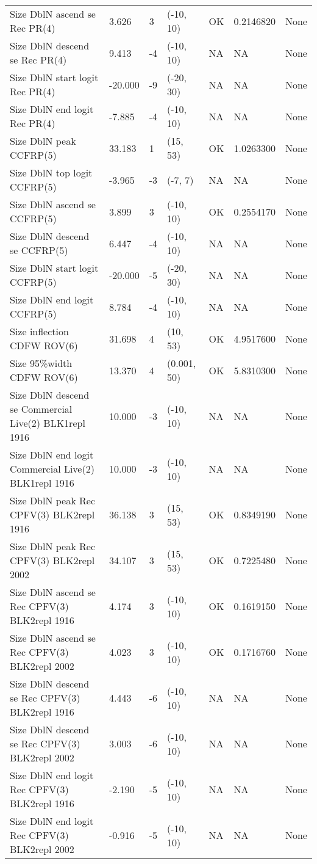 \documentclass[11pt,
  english,
  letterpaper,
]{article}
\begin{document}
\begin{landscape}
\begin{longtable}[t]{>{\raggedright\arraybackslash}p{7cm}lllll>{\raggedright\arraybackslash}p{4cm}}
Size DblN ascend se Rec PR(4) & 3.626 & 3 & (-10, 10) & OK & 0.2146820 & None\\
Size DblN descend se Rec PR(4) & 9.413 & -4 & (-10, 10) & NA & NA & None\\
Size DblN start logit Rec PR(4) & -20.000 & -9 & (-20, 30) & NA & NA & None\\
Size DblN end logit Rec PR(4) & -7.885 & -4 & (-10, 10) & NA & NA & None\\
Size DblN peak CCFRP(5) & 33.183 & 1 & (15, 53) & OK & 1.0263300 & None\\
Size DblN top logit CCFRP(5) & -3.965 & -3 & (-7, 7) & NA & NA & None\\
Size DblN ascend se CCFRP(5) & 3.899 & 3 & (-10, 10) & OK & 0.2554170 & None\\
Size DblN descend se CCFRP(5) & 6.447 & -4 & (-10, 10) & NA & NA & None\\
Size DblN start logit CCFRP(5) & -20.000 & -5 & (-20, 30) & NA & NA & None\\
Size DblN end logit CCFRP(5) & 8.784 & -4 & (-10, 10) & NA & NA & None\\
Size inflection CDFW ROV(6) & 31.698 & 4 & (10, 53) & OK & 4.9517600 & None\\
Size 95\%width CDFW ROV(6) & 13.370 & 4 & (0.001, 50) & OK & 5.8310300 & None\\
Size DblN descend se Commercial Live(2) BLK1repl 1916 & 10.000 & -3 & (-10, 10) & NA & NA & None\\
Size DblN end logit Commercial Live(2) BLK1repl 1916 & 10.000 & -3 & (-10, 10) & NA & NA & None\\
Size DblN peak Rec CPFV(3) BLK2repl 1916 & 36.138 & 3 & (15, 53) & OK & 0.8349190 & None\\
Size DblN peak Rec CPFV(3) BLK2repl 2002 & 34.107 & 3 & (15, 53) & OK & 0.7225480 & None\\
Size DblN ascend se Rec CPFV(3) BLK2repl 1916 & 4.174 & 3 & (-10, 10) & OK & 0.1619150 & None\\
Size DblN ascend se Rec CPFV(3) BLK2repl 2002 & 4.023 & 3 & (-10, 10) & OK & 0.1716760 & None\\
Size DblN descend se Rec CPFV(3) BLK2repl 1916 & 4.443 & -6 & (-10, 10) & NA & NA & None\\
Size DblN descend se Rec CPFV(3) BLK2repl 2002 & 3.003 & -6 & (-10, 10) & NA & NA & None\\
Size DblN end logit Rec CPFV(3) BLK2repl 1916 & -2.190 & -5 & (-10, 10) & NA & NA & None\\
Size DblN end logit Rec CPFV(3) BLK2repl 2002 & -0.916 & -5 & (-10, 10) & NA & NA & None\\

\end{longtable}
\end{landscape}
\end{document}
